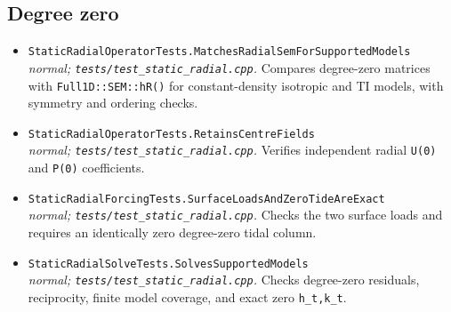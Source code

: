 \subsection*{Degree zero}
\begin{itemize}[leftmargin=1.4em,itemsep=0.35em]
\item {\footnotesize\texttt{StaticRadialOperatorTests.MatchesRadialSemForSupportedModels}}\\
\emph{normal; \texttt{tests/test\_static\_radial.cpp}.} Compares degree-zero matrices with \texttt{Full1D::SEM::hR()} for constant-density isotropic and TI models, with symmetry and ordering checks.
\item {\footnotesize\texttt{StaticRadialOperatorTests.RetainsCentreFields}}\\
\emph{normal; \texttt{tests/test\_static\_radial.cpp}.} Verifies independent radial \texttt{U(0)} and \texttt{P(0)} coefficients.
\item {\footnotesize\texttt{StaticRadialForcingTests.SurfaceLoadsAndZeroTideAreExact}}\\
\emph{normal; \texttt{tests/test\_static\_radial.cpp}.} Checks the two surface loads and requires an identically zero degree-zero tidal column.
\item {\footnotesize\texttt{StaticRadialSolveTests.SolvesSupportedModels}}\\
\emph{normal; \texttt{tests/test\_static\_radial.cpp}.} Checks degree-zero residuals, reciprocity, finite model coverage, and exact zero \texttt{h\_t,k\_t}.
\end{itemize}
